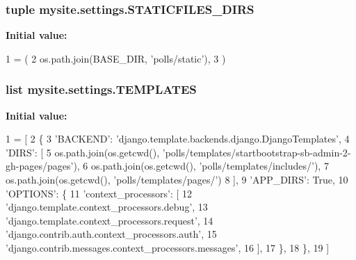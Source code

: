 \hypertarget{namespacemysite_1_1settings_a1c46d3671849b1ba43b7b89d348a0faa}{
\subsubsection[{S\-T\-A\-T\-I\-C\-F\-I\-L\-E\-S\-\_\-\-D\-I\-R\-S}]{\setlength{\rightskip}{0pt plus 5cm}tuple mysite.\-settings.\-S\-T\-A\-T\-I\-C\-F\-I\-L\-E\-S\-\_\-\-D\-I\-R\-S}}\label{namespacemysite_1_1settings_a1c46d3671849b1ba43b7b89d348a0faa}
{\bfseries Initial value\-:}
\begin{DoxyCode}
1 = (
2     os.path.join(BASE\_DIR, \textcolor{stringliteral}{'polls/static'}),
3 )
\end{DoxyCode}
\hypertarget{namespacemysite_1_1settings_a073a410822eed069da826d807a904fff}{
\subsubsection[{T\-E\-M\-P\-L\-A\-T\-E\-S}]{\setlength{\rightskip}{0pt plus 5cm}list mysite.\-settings.\-T\-E\-M\-P\-L\-A\-T\-E\-S}}\label{namespacemysite_1_1settings_a073a410822eed069da826d807a904fff}
{\bfseries Initial value\-:}
\begin{DoxyCode}
1 = [
2     \{
3         \textcolor{stringliteral}{'BACKEND'}: \textcolor{stringliteral}{'django.template.backends.django.DjangoTemplates'},
4         \textcolor{stringliteral}{'DIRS'}: [
5             os.path.join(os.getcwd(), \textcolor{stringliteral}{'polls/templates/startbootstrap-sb-admin-2-gh-pages/pages'}),
6             os.path.join(os.getcwd(), \textcolor{stringliteral}{'polls/templates/includes/'}),
7             os.path.join(os.getcwd(), \textcolor{stringliteral}{'polls/templates/pages/'})
8         ],
9         \textcolor{stringliteral}{'APP\_DIRS'}: \textcolor{keyword}{True},
10         \textcolor{stringliteral}{'OPTIONS'}: \{
11             \textcolor{stringliteral}{'context\_processors'}: [
12                 \textcolor{stringliteral}{'django.template.context\_processors.debug'},
13                 \textcolor{stringliteral}{'django.template.context\_processors.request'},
14                 \textcolor{stringliteral}{'django.contrib.auth.context\_processors.auth'},
15                 \textcolor{stringliteral}{'django.contrib.messages.context\_processors.messages'},
16             ],
17         \},
18     \},
19 ]
\end{DoxyCode}
